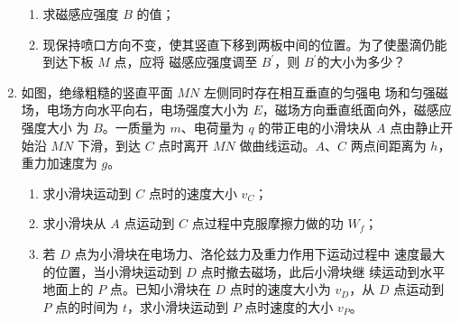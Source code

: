 \begin{enumerate}
\begin{enumerate}
\item 
求磁感应强度 $ B $ 的值；

\item 
现保持喷口方向不变，使其竖直下移到两板中间的位置。为了使墨滴仍能到达下板 $ M $ 点，应将
磁感应强度调至 $ B ^{\prime} $，则 $ B ^{\prime} $的大小为多少？

\end{enumerate}
\begin{figure}[h!]
	\flushright
	
\end{figure}




\item 
{}
如图，绝缘粗糙的竖直平面 $ MN $ 左侧同时存在相互垂直的匀强电
场和匀强磁场，电场方向水平向右，电场强度大小为 $ E $，磁场方向垂直纸面向外，磁感应强度大小
为 $ B $。一质量为 $ m $、电荷量为 $ q $ 的带正电的小滑块从 $ A $ 点由静止开始沿 $ MN $ 下滑，到达 $ C $ 点时离开
$ MN $ 做曲线运动。$ A $、$ C $ 两点间距离为 $ h $，重力加速度为 $ g $。
\begin{enumerate}
	\item
求小滑块运动到 $ C $ 点时的速度大小 $ v_{C} $；



\item 
求小滑块从 $ A $ 点运动到 $ C $ 点过程中克服摩擦力做的功 $ W_f $；

\item 
若 $ D $ 点为小滑块在电场力、洛伦兹力及重力作用下运动过程中
速度最大的位置，当小滑块运动到 $ D $ 点时撤去磁场，此后小滑块继
续运动到水平地面上的 $ P $ 点。已知小滑块在 $ D $ 点时的速度大小为 $ v_{D} $，从 $ D $ 点运动到 $ P $ 点的时间为
$ t $，求小滑块运动到 $ P $ 点时速度的大小 $ v_{P} $。


\end{enumerate}
\end{enumerate}

